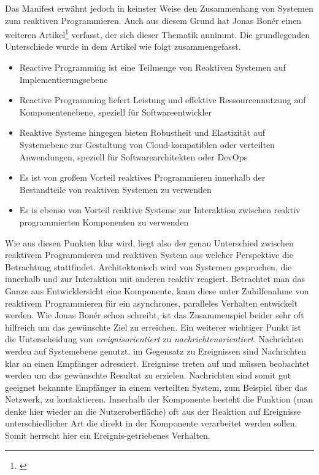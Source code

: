 Das Manifest erwähnt jedoch in keinster Weise den Zusammenhang von Systemen zum reaktiven Programmieren. Auch aus diesem Grund hat Jonas Bonér einen weiteren Artikel\footnote{\cite{Boner.2014}} verfasst, der sich dieser Thematik annimmt. Die grundlegenden Unterschiede wurde in dem Artikel wie folgt zusammengefasst.
\begin{itemize}
	\item Reactive Programming ist eine Teilmenge von Reaktiven Systemen auf Implementierungsebene
	\item Reactive Programming liefert Leistung und effektive Ressourcennutzung auf Komponentenebene, speziell für Softwareentwickler
	\item Reaktive Systeme hingegen bieten Robustheit und Elastizität auf Systemebene zur Gestaltung von Cloud-kompatiblen oder verteilten Anwendungen, speziell für Softwarearchitekten oder DevOps
	\item Es ist von großem Vorteil reaktives Programmieren innerhalb der Bestandteile von reaktiven Systemen zu verwenden
	\item Es is ebenso von Vorteil reaktive Systeme zur Interaktion zwischen reaktiv programmierten Komponenten zu verwenden
\end{itemize}
Wie aus diesen Punkten klar wird, liegt also der genau Unterschied zwischen reaktivem Programmieren und reaktiven System aus welcher Perspektive die Betrachtung stattfindet. Architektonisch wird von Systemen gesprochen, die innerhalb und zur Interaktion mit anderen reaktiv reagiert. Betrachtet man das Ganze aus Entwicklersicht eine Komponente, kann diese unter Zuhilfenahme von reaktivem Programmieren für ein asynchrones, paralleles Verhalten entwickelt werden. Wie Jonas Bonér schon schreibt, ist das Zusammenspiel beider sehr oft hilfreich um das gewünschte Ziel zu erreichen. Ein weiterer wichtiger Punkt ist die Unterscheidung von \textit{ereignisorientiert} zu \textit{nachrichtenorientiert}. Nachrichten werden auf Systemebene genutzt. im Gegensatz zu Ereignissen sind Nachrichten klar an einen Empfänger adressiert. Ereignisse treten auf und müssen beobachtet werden um das gewünschte Resultat zu erzielen. Nachrichten sind somit gut geeignet bekannte Empfänger in einem verteilten System, zum Beispiel über das Netzwerk, zu kontaktieren. Innerhalb der Komponente besteht die Funktion (man denke hier wieder an die Nutzeroberfläche) oft aus der Reaktion auf Ereignisse unterschiedlicher Art die direkt in der Komponente verarbeitet werden sollen. Somit herrscht hier ein Ereignis-getriebenes Verhalten. 

